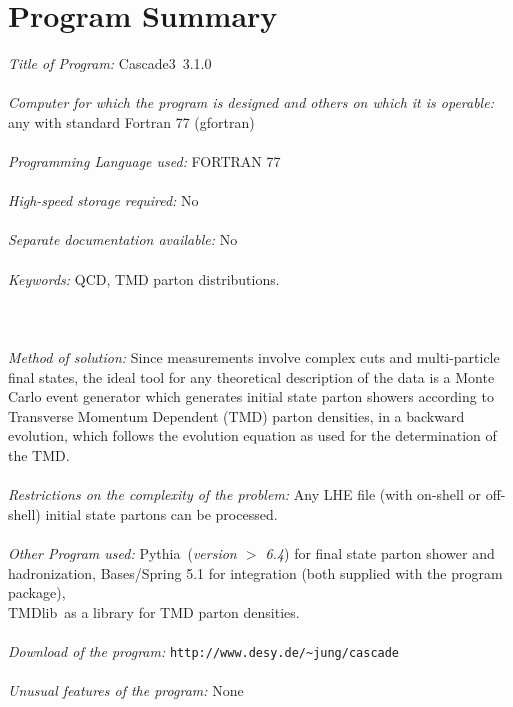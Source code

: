 \documentclass[11pt]{article} \usepackage{mystyle-new}
\def\cascade{{\sc Cascade3}}
\def\PYTHIA{{\sc Pythia}}
\def\tmdlib{{\sc TMDlib}}
\begin{document}
 \newpage
 \section{Program Summary}
 
{\em Title of Program:} \cascade\ 3.1.0 \\ \\
{\em Computer for which the program is designed and others on which it is
operable:}   any with standard Fortran 77 (gfortran)\\ \\
{\em Programming Language used:}  FORTRAN 77 \\ \\
{\em High-speed storage required:}  No \\ \\
{\em Separate documentation available: } No \\ \\
{\em Keywords: } QCD, TMD parton distributions.\\ \\
\\ \\
{\em Method of solution:}  
Since measurements involve complex cuts and multi-particle final states, the 
ideal tool for any theoretical description of the data is a Monte Carlo 
event generator which generates initial state parton showers according to Transverse Momentum Dependent (TMD) parton densities, in a backward evolution, which  follows the evolution equation as used for the determination of the TMD. \\ \\
{\em Restrictions on the complexity of the problem:}  
Any LHE file (with on-shell or off-shell) initial state partons can be processed.\\ \\
{\em Other Program used:}  \PYTHIA\ ({\it version $>$ 6.4}) for final state parton shower and hadronization,  {\sc Bases/Spring}  5.1 
for integration (both supplied with the program package), \\
\tmdlib\ as a library for TMD parton densities. \\ \\
{\em Download of the program:} \verb+http://www.desy.de/~jung/cascade+\\ \\
{\em Unusual features of the program:}   None \\ \\
\newpage
\end{document}
